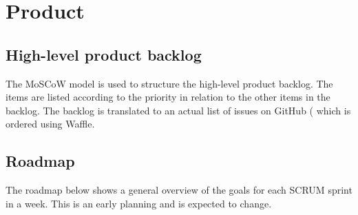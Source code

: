 \chapter{Product}

\section{High-level product backlog}
The MoSCoW model is used to structure the high-level product backlog.
The items are listed according to the priority in relation to the other items in the backlog.
The backlog is translated to an actual list of issues on \gls{GitHub} ( which is ordered using Waffle\cite{waffle}.


\section{Roadmap}
The roadmap below shows a general overview of the goals for each \gls{SCRUM} sprint in a week.
This is an early planning and is expected to change.


